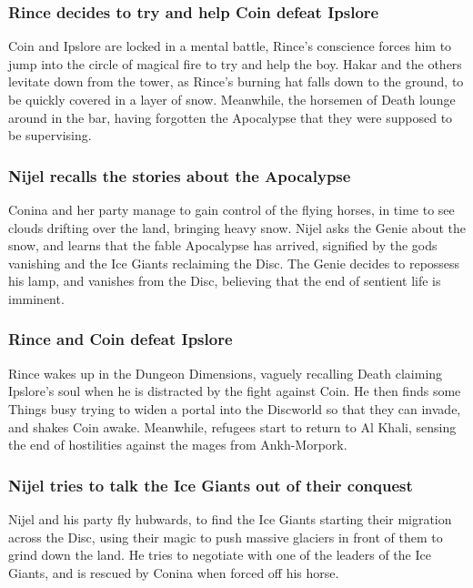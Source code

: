 \subsubsection{\Gls{Rince} decides to try and help \Gls{Coin} defeat \Gls{Ipslore}}
\Gls{Coin} and \Gls{Ipslore} are locked in a mental battle, \Gls{Rince}'s conscience forces him
to jump into the circle of magical fire to try and help the boy. \Gls{Hakar} and the others
levitate down from the tower, as \Gls{Rince}'s burning hat falls down to the ground, to be quickly
covered in a layer of snow. Meanwhile, the horsemen of \Gls{Death} lounge around in the bar,
having forgotten the Apocalypse that they were supposed to be supervising.

\subsubsection{\Gls{Nijel} recalls the stories about the Apocalypse}
\Gls{Conina} and her party manage to gain control of the flying horses, in time to see clouds
drifting over the land, bringing heavy snow. \Gls{Nijel} asks the \Gls{Genie} about the snow, and
learns that the fable Apocalypse has arrived, signified by the gods vanishing and the Ice Giants
reclaiming the Disc. The \Gls{Genie} decides to repossess his lamp, and vanishes from the Disc,
believing that the end of sentient life is imminent.

\subsubsection{\Gls{Rince} and \Gls{Coin} defeat \Gls{Ipslore}}
\Gls{Rince} wakes up in the Dungeon Dimensions, vaguely recalling \Gls{Death} claiming
\Gls{Ipslore}'s soul when he is distracted by the fight against \Gls{Coin}. He then finds some
Things busy trying to widen a portal into the Discworld so that they can invade, and shakes
\Gls{Coin} awake. Meanwhile, refugees start to return to Al Khali, sensing the end of hostilities
against the mages from Ankh-Morpork.

\subsubsection{\Gls{Nijel} tries to talk the Ice Giants out of their conquest}
\Gls{Nijel} and his party fly hubwards, to find the Ice Giants starting their migration across the
Disc, using their magic to push massive glaciers in front of them to grind down the land. He tries
to negotiate with one of the leaders of the Ice Giants, and is rescued by \Gls{Conina} when forced
off his horse.

